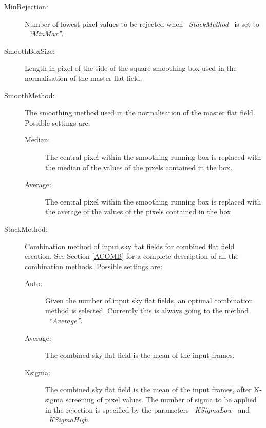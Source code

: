 \begin{description}
\item [MinRejection:]  Number of lowest pixel values to be rejected 
                       when \ {\it StackMethod} \ is set to \ {\it ``MinMax''}.

\item [SmoothBoxSize:] Length in pixel of the side of the square smoothing
                       box used in the normalisation of the master flat
                       field.

\item [SmoothMethod:]  The smoothing method used in the normalisation of the
                       master flat field. Possible settings are:

\begin{description}
  \item [Median:] The central pixel within the smoothing running box
                  is replaced with the median of the values of the
                  pixels contained in the box.

  \item [Average:] The central pixel within the smoothing running box
                  is replaced with the average of the values of the
                  pixels contained in the box.

\end{description}

\item [StackMethod:]  Combination method of input sky flat fields for 
                      combined flat field 
                      creation. See Section \ref{ACOMB} for a complete 
                      description of all the combination methods. Possible 
                      settings are:

\begin{description}

  \item [Auto:]     Given the number of input sky flat fields, an optimal 
                    combination method is selected. Currently this is
                    always going to the method \ {\it ``Average''}.

  \item [Average:]  The combined sky flat field is the mean of the 
                    input frames.

  \item [Ksigma:]   The combined sky flat field is the mean of the 
                    input frames, after
                    K-sigma screening of pixel values. The number of sigma 
                    to be applied in the rejection is specified by the 
                    parameters \ {\it KSigmaLow} \ and \ {\it KSigmaHigh}.


\end{description}
\end{description}
